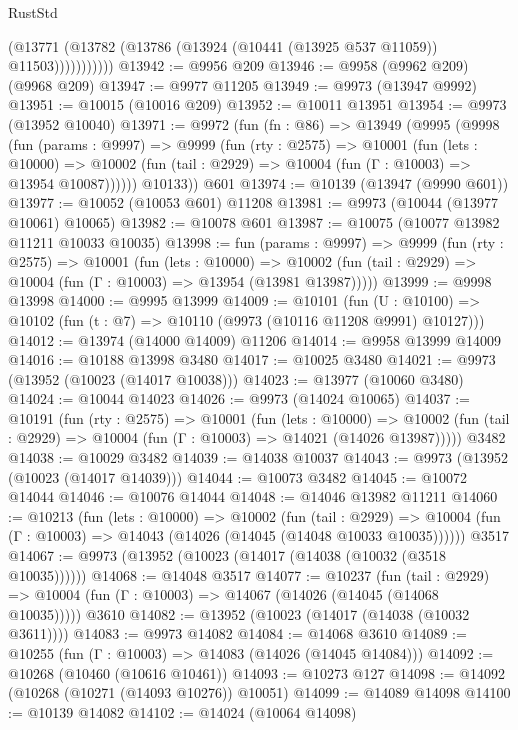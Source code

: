 \begin{lexlean}{RustStd}
\begin{coremodule}
                  (@13771 (@13782 (@13786 (@13924 (@10441 (@13925 @537 @11059)) @11503)))))))))))
@13942 := @9956 @209
@13946 := @9958 (@9962 @209) (@9968 @209)
@13947 := @9977 @11205
@13949 := @9973 (@13947 @9992)
@13951 := @10015 (@10016 @209)
@13952 := @10011 @13951
@13954 := @9973 (@13952 @10040)
@13971 := @9972
    (fun (fn : @86) =>
    @13949
      (@9995
        (@9998
          (fun (params : @9997) =>
          @9999
            (fun (rty : @2575) =>
            @10001
              (fun (lets : @10000) =>
              @10002 (fun (tail : @2929) => @10004 (fun (Γ : @10003) => @13954 @10087))))))
        @10133))
    @601
@13974 := @10139 (@13947 (@9990 @601))
@13977 := @10052 (@10053 @601) @11208
@13981 := @9973 (@10044 (@13977 @10061) @10065)
@13982 := @10078 @601
@13987 := @10075 (@10077 @13982 @11211 @10033 @10035)
@13998 := fun (params : @9997) =>
  @9999
    (fun (rty : @2575) =>
    @10001
      (fun (lets : @10000) =>
      @10002 (fun (tail : @2929) => @10004 (fun (Γ : @10003) => @13954 (@13981 @13987)))))
@13999 := @9998 @13998
@14000 := @9995 @13999
@14009 := @10101
    (fun (U : @10100) => @10102 (fun (t : @7) => @10110 (@9973 (@10116 @11208 @9991) @10127)))
@14012 := @13974 (@14000 @14009) @11206
@14014 := @9958 @13999 @14009
@14016 := @10188 @13998 @3480
@14017 := @10025 @3480
@14021 := @9973 (@13952 (@10023 (@14017 @10038)))
@14023 := @13977 (@10060 @3480)
@14024 := @10044 @14023
@14026 := @9973 (@14024 @10065)
@14037 := @10191
    (fun (rty : @2575) =>
    @10001
      (fun (lets : @10000) =>
      @10002 (fun (tail : @2929) => @10004 (fun (Γ : @10003) => @14021 (@14026 @13987)))))
    @3482
@14038 := @10029 @3482
@14039 := @14038 @10037
@14043 := @9973 (@13952 (@10023 (@14017 @14039)))
@14044 := @10073 @3482
@14045 := @10072 @14044
@14046 := @10076 @14044
@14048 := @14046 @13982 @11211
@14060 := @10213
    (fun (lets : @10000) =>
    @10002
      (fun (tail : @2929) =>
      @10004 (fun (Γ : @10003) => @14043 (@14026 (@14045 (@14048 @10033 @10035))))))
    @3517
@14067 := @9973 (@13952 (@10023 (@14017 (@14038 (@10032 (@3518 @10035))))))
@14068 := @14048 @3517
@14077 := @10237
    (fun (tail : @2929) => @10004 (fun (Γ : @10003) => @14067 (@14026 (@14045 (@14068 @10035)))))
    @3610
@14082 := @13952 (@10023 (@14017 (@14038 (@10032 @3611))))
@14083 := @9973 @14082
@14084 := @14068 @3610
@14089 := @10255 (fun (Γ : @10003) => @14083 (@14026 (@14045 @14084)))
@14092 := @10268 (@10460 (@10616 @10461))
@14093 := @10273 @127
@14098 := @14092 (@10268 (@10271 (@14093 @10276)) @10051)
@14099 := @14089 @14098
@14100 := @10139 @14082
@14102 := @14024 (@10064 @14098)

\end{coremodule}
\end{lexlean}
